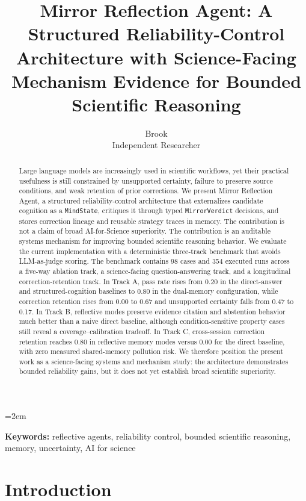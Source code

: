 \documentclass[12pt]{article}
\title{\textbf{Mirror Reflection Agent: A Structured Reliability-Control Architecture with Science-Facing Mechanism Evidence for Bounded Scientific Reasoning}}
\author{Brook \\ Independent Researcher}
\date{}
\begin{document}
\maketitle
\onehalfspacing
\emergencystretch=2em

\begin{abstract}
Large language models are increasingly used in scientific workflows, yet their practical usefulness is still constrained by unsupported certainty, failure to preserve source conditions, and weak retention of prior corrections. We present Mirror Reflection Agent, a structured reliability-control architecture that externalizes candidate cognition as a \texttt{MindState}, critiques it through typed \texttt{MirrorVerdict} decisions, and stores correction lineage and reusable strategy traces in memory. The contribution is not a claim of broad AI-for-Science superiority. The contribution is an auditable systems mechanism for improving bounded scientific reasoning behavior. We evaluate the current implementation with a deterministic three-track benchmark that avoids LLM-as-judge scoring. The benchmark contains 98 cases and 354 executed runs across a five-way ablation track, a science-facing question-answering track, and a longitudinal correction-retention track. In Track A, pass rate rises from 0.20 in the direct-answer and structured-cognition baselines to 0.80 in the dual-memory configuration, while correction retention rises from 0.00 to 0.67 and unsupported certainty falls from 0.47 to 0.17. In Track B, reflective modes preserve evidence citation and abstention behavior much better than a naive direct baseline, although condition-sensitive property cases still reveal a coverage--calibration tradeoff. In Track C, cross-session correction retention reaches 0.80 in reflective memory modes versus 0.00 for the direct baseline, with zero measured shared-memory pollution risk. We therefore position the present work as a science-facing systems and mechanism study: the architecture demonstrates bounded reliability gains, but it does not yet establish broad scientific superiority.
\end{abstract}

\noindent\textbf{Keywords:} reflective agents, reliability control, bounded scientific reasoning, memory, uncertainty, AI for science

\section{Introduction}
\end{document}

